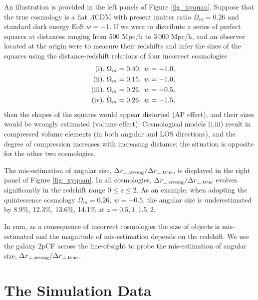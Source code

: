 \documentclass[iop]{emulateapj}
\begin{document}
An illustration is provided in the left panels of Figure \ref{fig_xyquan}.
Suppose that the true cosmology is a flat $\Lambda$CDM with present matter ratio $\Omega_m=0.26$
and standard dark energy EoS $w=-1$.
If we were to distribute a series of perfect squares at distances ranging from 500 Mpc/h to 3\,000 Mpc/h,
and an observer located at the origin were to measure their redshifts and infer the sizes of the squares
using the distance-redshift relations of four incorrect cosmologies
\begin{eqnarray}
 & &{\rm (i)}.\ \Omega_m=0.40,\ w=-1.0, \nonumber \\ 
 & &{\rm (ii)}.\ \Omega_m=0.15,\ w=-1.0, \nonumber\\ \noindent
 & &{\rm (iii)}.\ \Omega_m=0.26,\ w=-0.5,\nonumber\\ \noindent
 & &{\rm (iv)}.\ \Omega_m=0.26,\ w=-1.5,  \nonumber \noindent 
\end{eqnarray}
then the shapes of the squares would appear distorted (AP effect),
and their sizes would be wrongly estimated (volume effect).
Cosmological models (i,iii) result in compressed volume elements (in both angular and LOS directions),
and the degree of compression increases with increasing distance;
the situation is opposite for the other two cosmologies.

The mis-estimation of angular size, ${\Delta r_{\perp, \rm wrong}}/{\Delta r_{\perp, \rm true}}$, 
is displayed in the right panel of Figure \ref{fig_xyquan}.
In all cosmologies, ${\Delta r_{\perp, \rm wrong}}/{\Delta r_{\perp, \rm true}}$ evolves significantly in the redshift range $0\leq z\leq 2$.
As an example, when adopting the quintessence cosmology $\Omega_m=0.26,\ w=-0.5$,
the angular size is underestimated by 
8.9\%, 12.3\%, 13.6\%, 14.1\% 
at $z=0.5,1,1.5,2$.


In sum, as a consequence of incorrect cosmologies 
the size of objects is mis-estimated and the magnitude of mis-estimation depends on the redshift.
We use the galaxy 2pCF across the line-of-sight to probe the mis-estimation of angular size, ${\Delta r_{\perp, \rm wrong}}/{\Delta r_{\perp, \rm true}}$.


\section{The Simulation Data}\label{sec:data}
\end{document}
